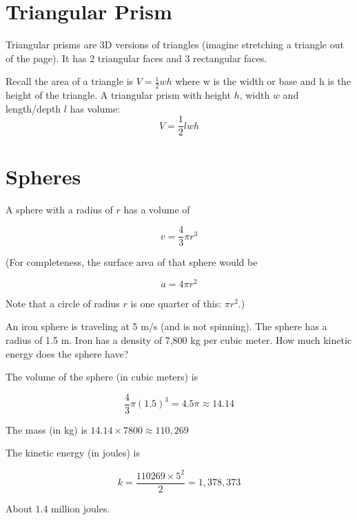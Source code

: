 \section{Triangular Prism}
Triangular prisms are 3D versions of triangles (imagine stretching a triangle out of the page). 
It has 2 triangular faces and 3 rectangular faces.
\begin{mdframed}[style=important, frametitle={Volume of a triangular prism.}]
Recall the area of a triangle is $V=\frac{1}{2}wh$ where w is the width or base and h is the height of the triangle.
A triangular prism with height $h$, width $w$ and length/depth $l$ has volume:
$$V = \frac{1}{2}lwh$$
\end{mdframed}


\section{Spheres}
\begin{mdframed}[style=important, frametitle={Volume of a Sphere}]

A sphere with a radius of $r$ has a volume of 

$$v = \frac{4}{3} \pi r^3$$

(For completeness, the surface area of that sphere would be

$$a  = 4 \pi r^2$$

Note that a circle of radius $r$ is one quarter of this: $\pi r^2$.)

\end{mdframed}

\begin{Exercise}[title={Flying Sphere}, label=flying_sphere]

An iron sphere is traveling at 5 m/s (and is not spinning).  The
sphere has a radius of 1.5 m.  Iron has a density of 7,800 kg per
cubic meter.  How much kinetic energy does the sphere have?
\end{Exercise}
\begin{Answer}[ref=flying_sphere]
  The volume of the sphere (in cubic meters) is

  $$\frac{4}{3}\pi (1.5)^3 = 4.5 \pi \approx 14.14$$

  The mass (in kg) is $14.14 \times 7800 \approx 110,269$

  The kinetic energy (in joules) is

  $$k = \frac{110269 \times 5^2}{2} = 1,378,373$$

  About 1.4 million joules.
\end{Answer}

